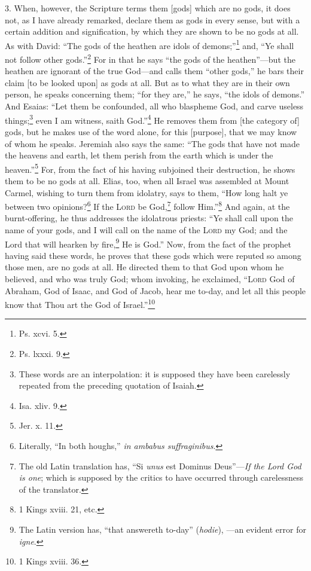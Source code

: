 3. When, however, the Scripture terms them [gods] which are no gods, it does not, as I have already remarked, declare them as gods in every sense, but with a certain addition and signification, by which they are shown to be no gods at all. As with David: “The gods of the heathen are idols of demons;”\footnote{Ps. xcvi. 5.} and, “Ye shall not follow other gods.”\footnote{Ps. lxxxi. 9.} For in that he says “the gods of the heathen”—but the heathen are ignorant of the true God—and calls them “other gods,” he bars their claim [to be looked upon] as gods at all. But as to what they are in their own person, he speaks concerning them; “for they are,” he says, “the idols of demons.” And Esaias: “Let them be confounded, all who blaspheme God, and carve useless things;\footnote{These words are an interpolation: it is supposed they have been carelessly repeated from the preceding quotation of Isaiah.} even I am witness, saith God.”\footnote{Isa. xliv. 9.} He removes them from [the category of] gods, but he makes use of the word alone, for this [purpose], that we may know of whom he speaks. Jeremiah also says the same: “The gods that have not made the heavens and earth, let them perish from the earth which is under the heaven.”\footnote{Jer. x. 11.} For, from the fact of his having subjoined their destruction, he shows them to be no gods at all. Elias, too, when all Israel was assembled at Mount Carmel, wishing to turn them from idolatry, says to them, “How long halt ye between two opinions?\footnote{Literally, “In both houghs,” \emph{in ambabus suffraginibus}.} If the \textsc{Lord} be God,\footnote{The old Latin translation has, “Si \emph{unus} est Dominus Deus”—\emph{If the Lord God is one}; which is supposed by the critics to have occurred through carelessness of the translator.} follow Him.”\footnote{1 Kings xviii. 21, etc.} And again, at the burnt-offering, he thus addresses the idolatrous priests: “Ye shall call upon the name of your gods, and I will call on the name of the \textsc{Lord} my God; and the Lord that will hearken by fire,\footnote{The Latin version has, “that answereth to-day” (\emph{hodie}), —an evident error for \emph{igne}.} He is God.” Now, from the fact of the prophet having said these words, he proves that these gods which were reputed so among those men, are no gods at all. He directed them to that God upon whom he believed, and who was truly God; whom invoking, he exclaimed, “\textsc{Lord} God of Abraham, God of Isaac, and God of Jacob, hear me to-day, and let all this people know that Thou art the God of Israel.”\footnote{1 Kings xviii. 36.}

